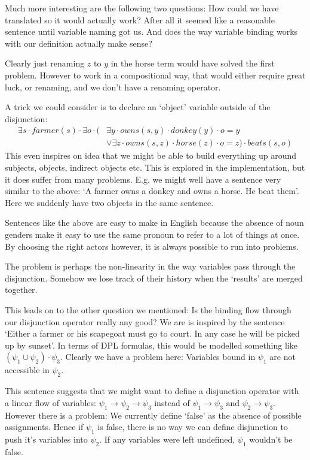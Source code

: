 \documentclass[12pt]{article}
\begin{document}
Much more interesting are the following two questions: How could we have translated \label{owns_donkey_or_horse} so it would actually work? After all it seemed like a reasonable sentence until variable naming got us. And does the way variable binding works with our definition actually make sense?

Clearly just renaming $z$ to $y$ in the horse term would have solved the first problem. However to work in a compositional way, that would either require great luck, or renaming, and we don't have a renaming operator.

A trick we could consider is to declare an `object' variable outside of the disjunction:
\begin{align}
\exists s\cdot farmer(s)\cdot\exists o\cdot(
      &\exists y\cdot owns(s,y)\cdot donkey(y)\cdot o=y \nonumber\\
      &\vee \exists z\cdot owns(s,z)\cdot horse(z)\cdot o=z)\cdot beats(s,o)
\end{align}
%
This even inspires on idea that we might be able to build everything up around subjects, objects, indirect objects etc. This is explored in the implementation, but it does suffer from many problems. E.g. we might well have a sentence very similar to the above: `A farmer owns a donkey and owns a horse. He beat them'. Here we suddenly have two objects in the same sentence.

Sentences like the above are easy to make in English because the absence of noun genders make it easy to use the same pronoun to refer to a lot of things at once. By choosing the right actors however, it is always possible to run into problems.

The problem is perhaps the non-linearity in the way variables pass through the disjunction. Somehow we lose track of their history when the `results' are merged together.

This leads on to the other question we mentioned: Is the binding flow through our disjunction operator really any good? We are is inspired by the sentence `Either a farmer or his scapegoat must go to court. In any case he will be picked up by sunset'. In terms of DPL formulas, this would be modelled something like $(\psi_1\cup\psi_2)\cdot\psi_3$. Clearly we have a problem here: Variables bound in $\psi_1$ are not accessible in $\psi_2$.

This sentence suggests that we might want to define a disjunction operator with a linear flow of variables: $\psi_1\to\psi_2\to\psi_3$ instead of $\psi_1\to\psi_3\text{ and }\psi_2\to\psi_3$. However there is a problem: We currently define `false' as the absence of possible assignments. Hence if $\psi_1$ is false, there is no way we can define disjunction to push it's variables into $\psi_2$. If any variables were left undefined, $\psi_1$ wouldn't be false.
\end{document}
